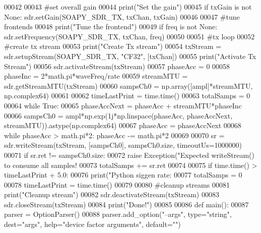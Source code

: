 \begin{DoxyCode}
{00042 
00043     \textcolor{comment}{#set overall gain}
00044     print(\textcolor{stringliteral}{"Set the gain"})
00045     \textcolor{keywordflow}{if} txGain \textcolor{keywordflow}{is} \textcolor{keywordflow}{not} \textcolor{keywordtype}{None}: sdr.setGain(SOAPY\_SDR\_TX, txChan, txGain)
00046 
00047     \textcolor{comment}{#tune frontends}
00048     print(\textcolor{stringliteral}{"Tune the frontend"})
00049     \textcolor{keywordflow}{if} freq \textcolor{keywordflow}{is} \textcolor{keywordflow}{not} \textcolor{keywordtype}{None}: sdr.setFrequency(SOAPY\_SDR\_TX, txChan, freq)
00050 
00051     \textcolor{comment}{#tx loop}
00052     \textcolor{comment}{#create tx stream}
00053     print(\textcolor{stringliteral}{"Create Tx stream"})
00054     txStream = sdr.setupStream(SOAPY\_SDR\_TX, \textcolor{stringliteral}{"CF32"}, [txChan])
00055     print(\textcolor{stringliteral}{"Activate Tx Stream"})
00056     sdr.activateStream(txStream)
00057     phaseAcc = 0
00058     phaseInc = 2*math.pi*waveFreq/rate
00059     streamMTU = sdr.getStreamMTU(txStream)
00060     sampsCh0 = np.array([ampl]*streamMTU, np.complex64)
00061     
00062     timeLastPrint = time.time()
00063     totalSamps = 0
00064     \textcolor{keywordflow}{while} \textcolor{keyword}{True}:
00065         phaseAccNext = phaseAcc + streamMTU*phaseInc
00066         sampsCh0 = ampl*np.exp(1j*np.linspace(phaseAcc, phaseAccNext, streamMTU)).astype(np.complex64)
00067         phaseAcc = phaseAccNext
00068         \textcolor{keywordflow}{while} phaseAcc > math.pi*2: phaseAcc -= math.pi*2
00069 
00070         sr = sdr.writeStream(txStream, [sampsCh0], sampsCh0.size, timeoutUs=1000000)
00071         \textcolor{keywordflow}{if} sr.ret != sampsCh0.size:
00072             \textcolor{keywordflow}{raise} Exception(\textcolor{stringliteral}{"Expected writeStream() to consume all samples! %
00073         totalSamps += sr.ret
00074 
00075         \textcolor{keywordflow}{if} time.time() > timeLastPrint + 5.0:
00076             print(\textcolor{stringliteral}{"Python siggen rate: %
00077             totalSamps = 0
00078             timeLastPrint = time.time()
00079 
00080     \textcolor{comment}{#cleanup streams}
00081     print(\textcolor{stringliteral}{"Cleanup stream"})
00082     sdr.deactivateStream(txStream)
00083     sdr.closeStream(txStream)
00084     print(\textcolor{stringliteral}{"Done!"})
00085 
00086 \textcolor{keyword}{def }main():
00087     parser = OptionParser()
00088     parser.add\_option(\textcolor{stringliteral}{"--args"}, type=\textcolor{stringliteral}{"string"}, dest=\textcolor{stringliteral}{"args"}, help=\textcolor{stringliteral}{"device factor arguments"}, default=\textcolor{stringliteral}{""})
}}}
\end{DoxyCode}
